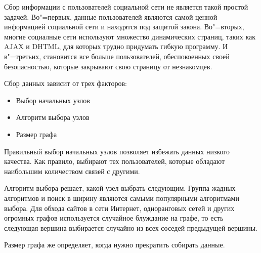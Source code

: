 Сбор информации с пользователей социальной сети не является такой простой задачей. Во"=первых, данные пользователей являются самой ценной информацией социальной сети и находятся под защитой закона. Во"=вторых, многие социалные сети используют множество динамических страниц, таких как AJAX и DHTML, для которых трудно придумать гибкую программу. И в"=третьих, становится все больше пользователей, обеспокоенных своей безопасностью, которые закрывают свою страницу от незнакомцев. 

Сбор данных зависит от трех факторов:
\begin{itemize}
    \item Выбор начальных узлов
    \item Алгоритм выбора узлов
    \item Размер графа
\end{itemize}
Правильный выбор начальных узлов позволяет избежать данных низкого качества. Как правило, выбирают тех пользователей, которые обладают наибольшим количеством связей с другими\cite{wong2014design}.

Алгоритм выбора решает, какой узел выбрать следующим. Группа жадных алгоритмов и поиск в ширину являются самыми популярными алгоритмами выбора\cite{CrawlingONS}. Для обхода сайтов в сети Интернет, одноранговых сетей и других огромных графов используется случайное блуждание на графе, то есть следующая вершина выбирается случайно из всех соседей предыдущей вершины\cite{gjoka2011practical}.

Размер графа же определяет, когда нужно прекратить собирать данные.